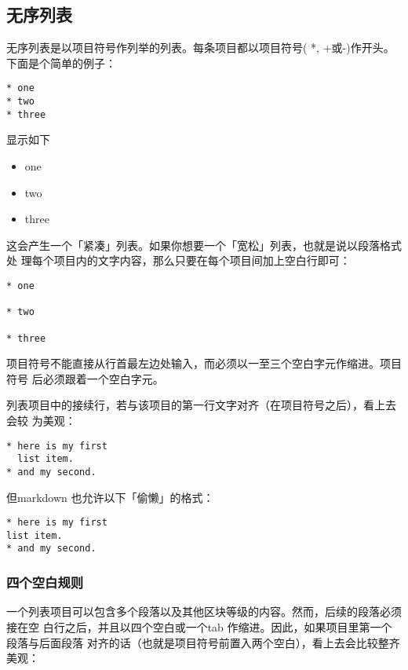 \documentclass[fancyhdr,bookmark]{ctexbook}
\begin{document}
\subsection{无序列表}\label{ux65e0ux5e8fux5217ux8868}

无序列表是以项目符号作列举的列表。每条项目都以项目符号( *, +或-)作开头。
下面是个简单的例子：

\begin{lstlisting}
* one
* two
* three
\end{lstlisting}

显示如下

\begin{itemize}
\itemsep1pt\parskip0pt
\item
  one
\item
  two
\item
  three
\end{itemize}

这会产生一个「紧凑」列表。如果你想要一个「宽松」列表，也就是说以段落格式处
理每个项目内的文字内容，那么只要在每个项目间加上空白行即可：

\begin{lstlisting}
* one

* two

* three
\end{lstlisting}

项目符号不能直接从行首最左边处输入，而必须以一至三个空白字元作缩进。项目符号
后必须跟着一个空白字元。

列表项目中的接续行，若与该项目的第一行文字对齐（在项目符号之后），看上去会较
为美观：

\begin{lstlisting}
* here is my first
  list item.
* and my second.
\end{lstlisting}

但markdown 也允许以下「偷懒」的格式：

\begin{lstlisting}
* here is my first
list item.
* and my second.
\end{lstlisting}

\subsubsection{四个空白规则}\label{ux56dbux4e2aux7a7aux767dux89c4ux5219}

一个列表项目可以包含多个段落以及其他区块等级的内容。然而，后续的段落必须接在空
白行之后，并且以四个空白或一个tab
作缩进。因此，如果项目里第一个段落与后面段落
对齐的话（也就是项目符号前置入两个空白），看上去会比较整齐美观：
\end{document}
